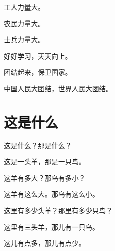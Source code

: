 \documentclass[12pt,UTF-8,openany]{ctexbook}
\begin{document}
\begin{large}
    
    工人力量大。
    
    农民力量大。
    
    士兵力量大。
    
    好好学习，天天向上。
    
    团结起来，保卫国家。
    
    中国人民大团结，世界人民大团结。
    
\end{large}


\clearpage

\begin{center}
    
    
\end{center}


\hanzibox{}\hanzibox{}\hanzibox{}\hanzibox{}\hspace{1em}\hanzibox{}\hanzibox{}\hanzibox{}\hanzibox{}

\hanzibox{}\hanzibox{}\hanzibox{}\hanzibox{}\hspace{1em}\hanzibox{}\hanzibox{}\hanzibox{}\hanzibox{}

\hanzibox{}\hanzibox{}\hanzibox{}\hanzibox{}\hspace{1em}\hanzibox{}\hanzibox{}\hanzibox{}\hanzibox{}

\hanzibox{}\hanzibox{}\hanzibox{}\hanzibox{}\hspace{1em}\hanzibox{}\hanzibox{}\hanzibox{}\hanzibox{}

\hanzibox{}\hanzibox{}\hanzibox{}\hanzibox{}\hspace{1em}




\chapter{这是什么}

\begin{large}
    
    这是什么？那是什么？
    
    这是一头羊，那是一只鸟。
    
    这羊有多大？那鸟有多小？
    
    这羊有这么大。那鸟有这么小。
    
    这里有多少头羊？那里有多少只鸟？
    
    这里有三头羊，那儿有一只鸟。
    
    这儿有点多，那儿有点少。
    
\end{large}
\end{document}
